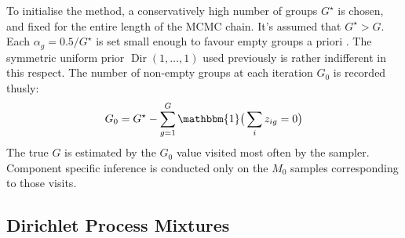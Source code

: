 \documentclass[a4paper,12pt,fleqn]{article}
\numberwithin{equation}{section}
\begin{document}
To initialise the method, a conservatively high number of groups $G^\star$ is chosen, and fixed for the entire length of the MCMC chain. It's assumed that $G^\star > G$. Each $\alpha_g = 0.5/G^\star$ is set small enough to favour empty groups a priori \cite{Ishwaran}. The symmetric uniform prior $\operatorname{Dir}\left(1,\ldots,1\right)$ used previously is rather indifferent in this respect. The number of non-empty groups at each iteration $G_0$ is recorded thusly:
\begin{equation}
	G_0 = G^{\star} - \sum_{g=1}^{G} \mathbbm{1}\big(\sum\limits_{i} z_{ig}=0\big)\label{eq:34}
\end{equation}
The true $G$ is estimated by the $G_0$ value visited most often by the sampler. Component specific inference is conducted only on the $M_0$ samples corresponding to those visits.

\subsection[Dirichlet Process Mixtures]{Dirichlet Process Mixtures}
\label{Dirichlet}

\end{document}
